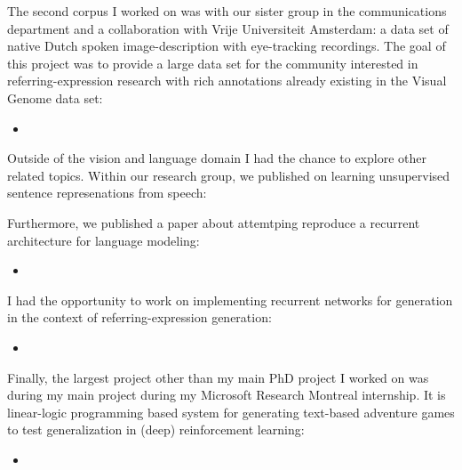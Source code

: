 The second corpus I worked on was with our sister group in the communications department and a collaboration with
Vrije Universiteit Amsterdam:  a data set of native Dutch spoken image-description with eye-tracking recordings.
The goal of this project was to provide a large data set for the community interested in referring-expression research with rich annotations already existing in the Visual Genome data set:

\begin{itemize}
\item {}
\end{itemize}

Outside of the vision and language domain I had the chance to explore other related topics.
Within our research group, we published on learning unsupervised sentence represenations
from speech:

\item {}

Furthermore, we published a paper about attemtping reproduce a
recurrent architecture for language modeling:

\begin{itemize}
\item {}
\end{itemize}

I had the opportunity to work on implementing recurrent networks for
generation in the context of referring-expression generation:

\begin{itemize}
\item {}
\end{itemize}


Finally, the largest project other than my main PhD project I worked
on was during my main project during my Microsoft Research Montreal internship.
It is linear-logic programming based system for
generating text-based adventure games to test
generalization in (deep) reinforcement learning:

\begin{itemize}
\item {}
\end{itemize}




